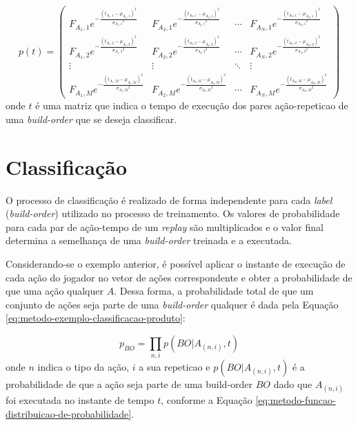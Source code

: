 \newcommand{\RPME}[4]{
	\ensuremath{
		{#1} e^{-\frac{(#4-{#2})^2}{{{#3}}^2}}
	}
}
\newcommand{\RPMGE}[1]{
	\RPME{F_{{#1}}}{\mu_{{#1}}}{\sigma_{{#1}}}{t_{{#1}}}
}


\begin{equation}
	p(t) = \left(
		\begin{array}{cccc}
			\RPMGE{A_1,1} & \RPMGE{A_2,1} & \cdots & \RPMGE{A_N,1} \\
 			\RPMGE{A_1,2} & \RPMGE{A_2,2} & \cdots & \RPMGE{A_N,2} \\
 			\vdots 	  	  & \vdots 	  	  & \ddots & \vdots 	       \\
 			\RPMGE{A_1,M} & \RPMGE{A_2,M} & \cdots & \RPMGE{A_N,M}
		\end{array}
	\right)
	\label{eq:metodo-matriz-probabilidade-simbolico}
\end{equation}
\noindent onde $t$ é uma matriz que indica o tempo de execução dos pares ação-\gls{repeticao} de uma \textit{\gls{build-order}} que se deseja classificar.

		\section{Classificação}
		\label{sec:classificacao}
O processo de classificação é realizado de forma independente para cada \textit{label} (\textit{\gls{build-order}}) utilizado no processo de treinamento. Os valores de probabilidade para cada par de ação-tempo de um \textit{\gls{replay}} são multiplicados e o valor final determina a semelhança de uma \textit{\gls{build-order}} treinada e a executada.

Considerando-se o exemplo anterior, é possível aplicar o instante de execução de cada ação do jogador no vetor de ações correspondente e obter a probabilidade de que uma ação qualquer $A$. Dessa forma, a probabilidade total de que um conjunto de ações seja parte de uma \textit{\gls{build-order}} qualquer é dada pela Equação \ref{eq:metodo-exemplo-classificacao-produto}:

\begin{equation}
	p_{BO} = \prod_{n,i} p(BO|A_{(n,i)}, t)
	\label{eq:metodo-exemplo-classificacao-produto}
\end{equation}
\noindent onde $n$ indica o tipo da ação, $i$ a sua \gls{repeticao} e $p(BO|A_{(n,i)}, t)$ é a probabilidade de que a ação seja parte de uma \gls{build-order} $BO$ dado que $A_{(n,i)}$ foi executada no instante de tempo $t$, conforme a Equação \ref{eq:metodo-funcao-distribuicao-de-probabilidade}.

